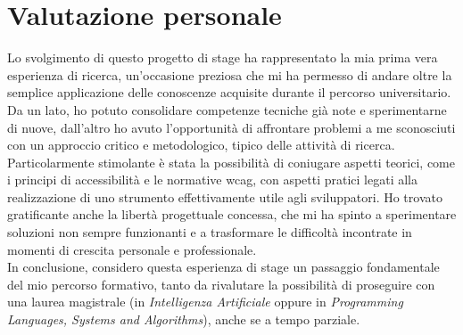 \section{Valutazione personale}
\noindent Lo svolgimento di questo progetto di stage ha rappresentato la mia prima vera esperienza di ricerca, un’occasione preziosa che mi ha permesso di andare oltre la semplice applicazione delle conoscenze acquisite durante il percorso universitario. Da un lato, ho potuto consolidare competenze tecniche già note e sperimentarne di nuove, dall’altro ho avuto l’opportunità di affrontare problemi a me sconosciuti con un approccio critico e metodologico, tipico delle attività di ricerca. Particolarmente stimolante è stata la possibilità di coniugare aspetti teorici, come i principi di accessibilità e le normative \acrshort{wcag}, con aspetti pratici legati alla realizzazione di uno strumento effettivamente utile agli sviluppatori. Ho trovato gratificante anche la libertà progettuale concessa, che mi ha spinto a sperimentare soluzioni non sempre funzionanti e a trasformare le difficoltà incontrate in momenti di crescita personale e professionale. \\
In conclusione, considero questa esperienza di stage un passaggio fondamentale del mio percorso formativo, tanto da rivalutare la possibilità di proseguire con una laurea magistrale (in \textit{Intelligenza Artificiale} oppure in \textit{Programming Languages, Systems and Algorithms}), anche se a tempo parziale.